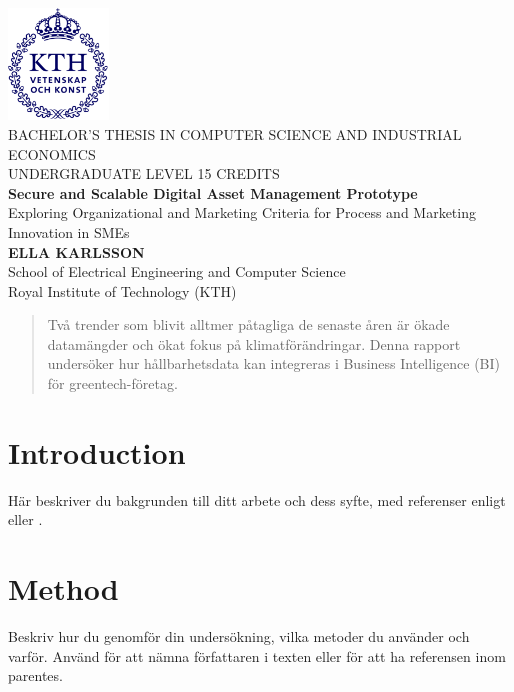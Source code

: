 \documentclass[a4paper,12pt,twocolumn]{article}
\begin{document}

\begin{titlepage}
    \centering
    \includegraphics[width=0.2\textwidth]{kthLogga.png}\\[1cm]
    {\large BACHELOR'S THESIS IN COMPUTER SCIENCE AND INDUSTRIAL ECONOMICS}\\[0.5cm]
    {\large UNDERGRADUATE LEVEL 15 CREDITS}\\[3cm]
    {\Huge \textbf{Secure and Scalable Digital Asset Management Prototype}}\\[0.5cm]
    {\Large Exploring Organizational and Marketing Criteria for Process and Marketing Innovation in SMEs}\\[1cm]
    \vfill
    {\Large \textbf{ELLA KARLSSON}}\\[1cm]
    \vfill
    {\large School of Electrical Engineering and Computer Science}\\
    {\large Royal Institute of Technology (KTH)}\\
\end{titlepage}

\clearpage


\begin{abstract}
Två trender som blivit alltmer påtagliga de senaste åren är ökade datamängder och ökat fokus på klimatförändringar. Denna rapport undersöker hur hållbarhetsdata kan integreras i Business Intelligence (BI) för greentech-företag.
\end{abstract}

\tableofcontents
\newpage

\section{Introduction}
Här beskriver du bakgrunden till ditt arbete och dess syfte, med referenser enligt \citet{author2025} eller \citep{author2025}.

\section{Method}
Beskriv hur du genomför din undersökning, vilka metoder du använder och varför. Använd \citet{example2025} för att nämna författaren i texten eller \citep{example2025} för att ha referensen inom parentes.
\end{document}
